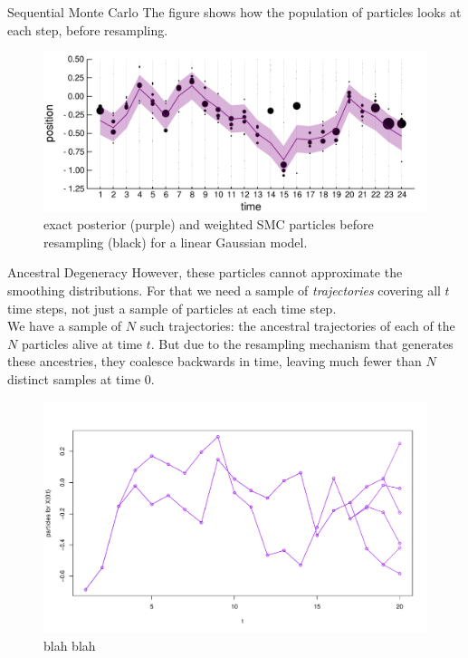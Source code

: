 \documentclass[final, 12pt]{beamer}
\newlength{\colwidth}
\begin{document}
\begin{frame}
\begin{columns}
\begin{column}{\colwidth}
\begin{block}{Sequential Monte Carlo}
The figure shows how the population of particles looks at each step, before resampling.
\begin{figure}
\includegraphics[width=\colwidth]{smc_kalman.pdf}
\caption{exact posterior (purple) and weighted SMC particles before resampling (black) for a linear Gaussian model.}
\end{figure}
\end{block}

\begin{block}{Ancestral Degeneracy}
However, these particles cannot approximate the smoothing distributions. For that we need a sample of \emph{trajectories} covering all $t$ time steps, not just a sample of particles at each time step.\\[10pt]

We have a sample of $N$ such trajectories: the ancestral trajectories of each of the $N$ particles alive at time $t$.
But due to the resampling mechanism that generates these ancestries, they coalesce backwards in time, leaving much fewer than $N$ distinct samples at time 0. 

\begin{figure}
\includegraphics[width=\colwidth]{degeneracy.pdf}
\caption{blah blah}
\end{figure}


\end{block}
\end{column}
\end{columns}
\end{frame}
\end{document}

